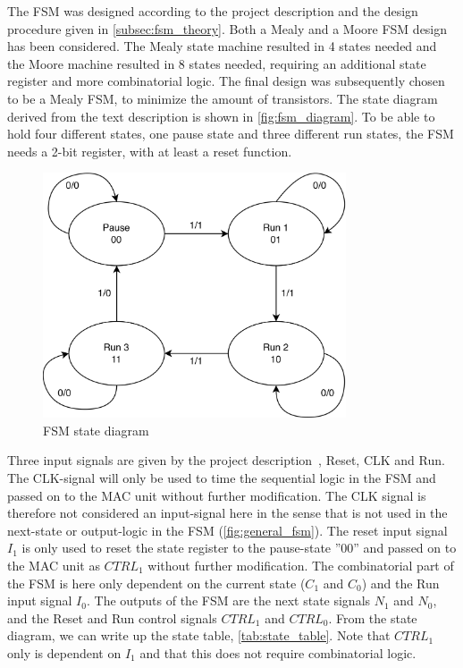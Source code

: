 The FSM was designed according to the project description and the design procedure given in \autoref{subsec:fsm_theory}. Both a Mealy and a Moore FSM design has been considered. The Mealy state machine resulted in 4 states needed and the Moore machine resulted in 8 states needed, requiring an additional state register and more combinatorial logic. The final design was subsequently chosen to be a Mealy FSM, to minimize the amount of transistors. The state diagram derived from the text description is shown in \autoref{fig:fsm_diagram}. To be able to hold four different states, one pause state and three different run states, the FSM needs a 2-bit register, with at least a reset function. 

\begin{figure}[H]
    \centering
    \includegraphics[width=0.8\textwidth]{Figures/FSM-diagram.png}
    \caption{FSM state diagram}
    \label{fig:fsm_diagram}
\end{figure}

Three input signals are given by the project description~\cite{project_description}, Reset, CLK and Run. The CLK-signal
will only be used to time the sequential logic in the FSM and passed on to the MAC unit without
further modification. The CLK signal is therefore not considered an input-signal here in the sense that is not used in the next-state or output-logic in the FSM (\autoref{fig:general_fsm}). The reset input signal $I_1$ is only used to reset the state register to the pause-state ''00'' and passed on to the MAC unit as $CTRL_1$ without further modification. The combinatorial part of the FSM is here only dependent on the current state ($C_1$ and $C_0$) and the Run input signal $I_0$. The outputs of the FSM are the next state signals $N_1$ and $N_0$, and the Reset and Run control signals $CTRL_1$ and $CTRL_0$. From the state diagram, we can write up the state table, \autoref{tab:state_table}. Note that $CTRL_1$ only is dependent on $I_1$ and that this does not require combinatorial logic.

